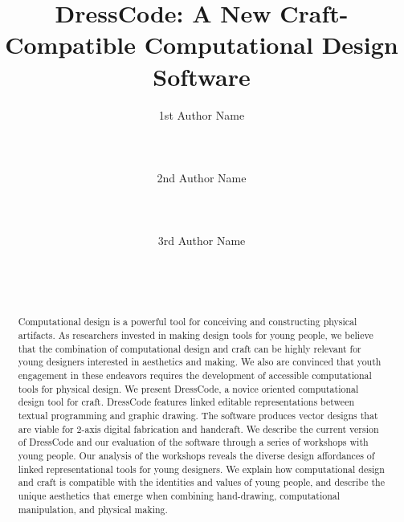 \documentclass{sigchi}
\begin{document}
\title{DressCode: A New Craft-Compatible Computational Design Software}

\author{
 \alignauthor 1st Author Name\\
 \\
 \\
 \\
 \alignauthor 2nd Author Name\\
 \\
 \\
 \\
 \alignauthor 3rd Author Name\\
 \\
 \\
 \\
}

\maketitle

\begin{abstract}
Computational design is a powerful tool for conceiving and constructing physical artifacts. As researchers invested in making design tools for young people, we believe that the combination of computational design and craft can be highly relevant for young designers interested in aesthetics and making. We also are convinced that youth engagement in these endeavors requires the development of accessible computational tools for physical design. We present DressCode, a novice oriented computational design tool for craft. DressCode features linked editable representations between textual programming and graphic drawing. The software produces vector designs that are viable for 2-axis digital fabrication and handcraft. We describe the current version of DressCode and our evaluation of the software through a series of workshops with young people. Our analysis of the workshops reveals the diverse design affordances of linked representational tools for young designers. We explain how computational design and craft is compatible with the identities and values of young people, and describe the unique aesthetics that emerge when combining hand-drawing, computational manipulation, and physical making.
\end{abstract}

\end{document}
